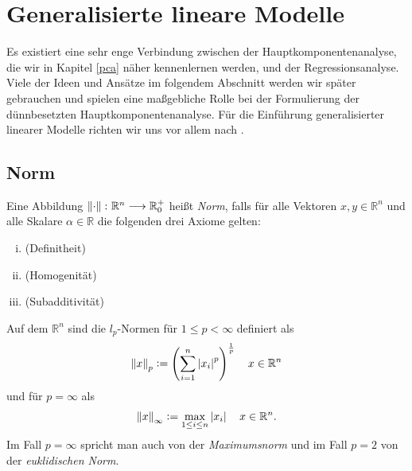 
\section{Generalisierte lineare Modelle}
\label{generalized_linear_models}

Es existiert eine sehr enge Verbindung zwischen der Hauptkomponentenanalyse, die wir in Kapitel \ref{pca} näher kennenlernen werden, und der Regressionsanalyse. Viele der Ideen und Ansätze im folgendem Abschnitt werden wir später gebrauchen und spielen eine maßgebliche Rolle bei der Formulierung der dünnbesetzten Hauptkomponentenanalyse. Für die Einführung generalisierter linearer Modelle richten wir uns vor allem nach \cite{hastie_elements}.

\subsection{Norm}

\begin{defn}
\label{norm}
Eine Abbildung $\left\lVert \cdot \right\rVert \colon \mathbb{R}^n \longrightarrow {\mathbb {R} }_{0}^{+}$ heißt \textit{Norm}, falls für alle Vektoren $x,y\in \mathbb{R}^n$ und alle Skalare $\alpha \in \mathbb{R}$ die folgenden drei Axiome gelten:
\begin{enumerate}[(i)]
\item {}(Definitheit)
\item {}(Homogenität)
\item {}(Subadditivität)
\end{enumerate}
\end{defn}

\begin{defn} 
\label{lp_norm}
Auf dem $\mathbb{R}^n$ sind die $l_p$-Normen für $1 \leq p < \infty$ definiert als
$$\left\lVert x \right\rVert_p \vcentcolon= \left( \sum_{i=1}^{n} \left\lvert x_i \right\rvert^{p} \right) ^{\frac{1}{p}} \quad x \in \mathbb{R}^{n}$$
und für $p = \infty$ als
$$\left\lVert x \right\rVert_{\infty} \vcentcolon= \max_{1 \leq i \leq n} \left\lvert x_i \right\rvert \quad x \in \mathbb{R}^{n}.$$
Im Fall $p = \infty$ spricht man auch von der \textit{Maximumsnorm} und im Fall $p = 2$ von der \textit{euklidischen Norm}.
\end{defn}

